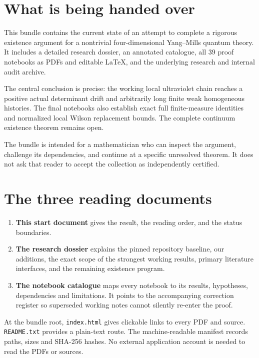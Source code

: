 \section*{What is being handed over}

This bundle contains the current state of an attempt to complete
a rigorous existence argument for a nontrivial four-dimensional
Yang--Mills quantum theory. It includes a detailed research
dossier, an annotated catalogue, all 39 proof notebooks as
PDFs and editable LaTeX, and the underlying research and
internal audit archive.

The central conclusion is precise: the working local ultraviolet
chain reaches a positive actual determinant drift and arbitrarily
long finite weak homogeneous histories. The final notebooks also
establish exact full finite-measure identities and normalized
local Wilson replacement bounds. The complete continuum
existence theorem remains open.

The bundle is intended for a mathematician who can inspect
the argument, challenge its dependencies, and continue at a
specific unresolved theorem. It does not ask that reader
to accept the collection as independently certified.

\section*{The three reading documents}

\begin{enumerate}
\item \textbf{This start document} gives the result, the
reading order, and the status boundaries.
\item \textbf{The research dossier} explains the pinned
repository baseline, our additions, the exact scope of
the strongest working results, primary literature
interfaces, and the remaining existence program.
\item \textbf{The notebook catalogue} maps every notebook
to its results, hypotheses, dependencies and limitations.
It points to the accompanying correction register so superseded working
notes cannot silently re-enter the proof.
\end{enumerate}

At the bundle root, \texttt{index.html} gives clickable
links to every PDF and source. \texttt{README.txt}
provides a plain-text route. The machine-readable
manifest records paths, sizes and SHA-256 hashes.
No external application account is needed to read
the PDFs or sources.

